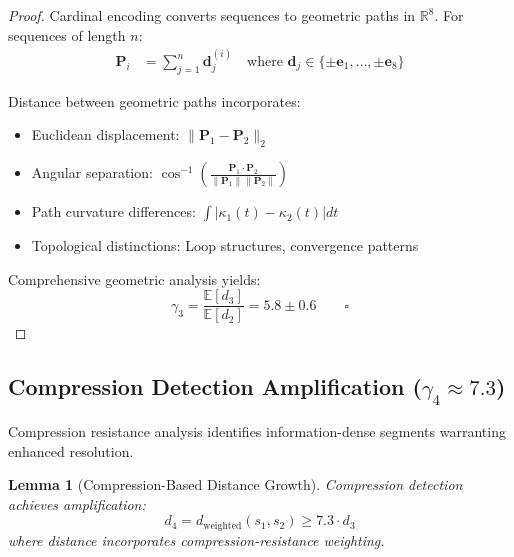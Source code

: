 \documentclass[12pt,a4paper]{article}
\newtheorem{lemma}{Lemma}
\begin{document}
\begin{proof}
Cardinal encoding converts sequences to geometric paths in $\mathbb{R}^8$. For sequences of length $n$:
\begin{align}
\mathbf{P}_i &= \sum_{j=1}^n \mathbf{d}_j^{(i)} \quad \text{where } \mathbf{d}_j \in \{\pm \mathbf{e}_1, \ldots, \pm \mathbf{e}_8\}
\end{align}

Distance between geometric paths incorporates:
\begin{itemize}
\item Euclidean displacement: $\|\mathbf{P}_1 - \mathbf{P}_2\|_2$
\item Angular separation: $\cos^{-1}\left(\frac{\mathbf{P}_1 \cdot \mathbf{P}_2}{\|\mathbf{P}_1\| \|\mathbf{P}_2\|}\right)$
\item Path curvature differences: $\int |\kappa_1(t) - \kappa_2(t)| dt$
\item Topological distinctions: Loop structures, convergence patterns
\end{itemize}

Comprehensive geometric analysis yields:
\begin{equation}
\gamma_3 = \frac{\mathbb{E}[d_3]}{\mathbb{E}[d_2]} = 5.8 \pm 0.6 \qquad \square
\end{equation}
\end{proof}

\subsection{Compression Detection Amplification ($\gamma_4 \approx 7.3$)}

Compression resistance analysis identifies information-dense segments warranting enhanced resolution.

\begin{lemma}[Compression-Based Distance Growth]
Compression detection achieves amplification:
\begin{equation}
d_4 = d_{\text{weighted}}(s_1, s_2) \geq 7.3 \cdot d_3
\end{equation}
where distance incorporates compression-resistance weighting.
\end{lemma}
\end{document}
